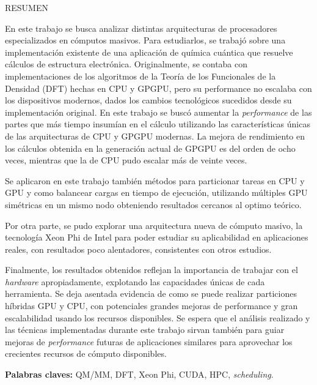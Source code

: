 \begin{center}
\large \textsc{RESUMEN}
\end{center}
\vspace{1cm}

\noindent

En este trabajo se busca analizar distintas arquitecturas de procesadores especializados
en c\'omputos masivos. Para estudiarlos, se trabaj\'o sobre una implementaci\'on existente
de una aplicaci\'on de qu\'imica cu\'antica que resuelve c\'alculos de estructura electr\'onica.
Originalmente, se contaba con implementaciones de los algoritmos de la Teor\'ia de los
Funcionales de la Densidad (DFT) hechas en CPU y GPGPU, pero su performance no escalaba con los
dispositivos modernos, dados los cambios tecnol\'ogicos sucedidos desde su implementaci\'on original.
En este trabajo se busc\'o
aumentar la \textit{performance} de las partes que m\'as tiempo insum\'ian en el c\'alculo utilizando
las caracter\'isticas \'unicas de las arquitecturas de CPU y GPGPU modernas. La mejora de
rendimiento en los c\'alculos obtenida en la generaci\'on actual de GPGPU es del orden de ocho
veces, mientras que la de CPU pudo escalar m\'as de veinte veces.

Se aplicaron en este trabajo tambi\'en m\'etodos para particionar tareas en CPU y GPU y como
balancear cargas en tiempo de ejecuci\'on, utilizando m\'ultiples GPU sim\'etricas en un mismo nodo
obteniendo resultados cercanos al optimo te\'orico.

Por otra parte, se pudo explorar una arquitectura nueva de c\'omputo masivo, la
tecnolog\'ia Xeon Phi de Intel para poder estudiar su aplicabilidad en aplicaciones reales, con
resultados poco alentadores, consistentes con otros estudios.

Finalmente, los resultados obtenidos reflejan la importancia de trabajar con el \textit{hardware}
apropiadamente, explotando las capacidades \'unicas de cada herramienta. Se deja asentada evidencia
de como se puede realizar particiones h\'ibridas GPU y CPU, con potenciales grandes mejoras
de performance y gran escalabilidad usando los recursos disponibles. Se espera que el an\'alisis
realizado y las t\'ecnicas implementadas durante este trabajo sirvan tambi\'en para guiar mejoras
de \textit{performance} futuras de aplicaciones similares para aprovechar los crecientes recursos de c\'omputo
disponibles.

\bigskip

\noindent\textbf{Palabras claves:} QM/MM, DFT, Xeon Phi, CUDA, HPC, \textit{scheduling}.
